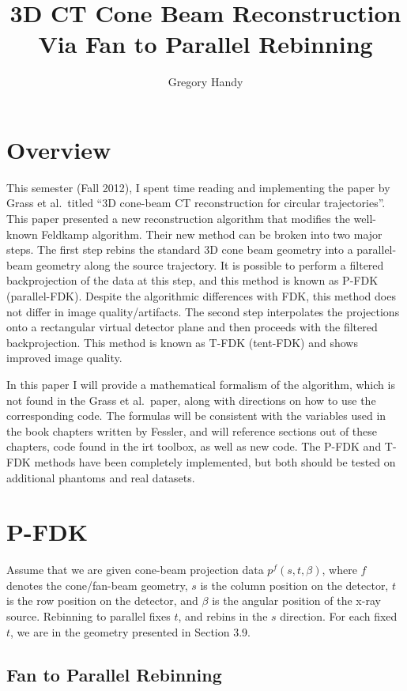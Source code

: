 \documentclass[12pt]{elsarticle}
\title{3D CT Cone Beam Reconstruction Via Fan to Parallel Rebinning}
\author{Gregory Handy}
\begin{document}
\maketitle

\section{Overview}


This semester (Fall 2012), I spent time reading and implementing the paper by Grass et al.\ titled ``3D cone-beam CT reconstruction for circular trajectories''. This paper presented a new reconstruction algorithm that modifies the well-known Feldkamp algorithm. Their new method can be broken into two major steps. The first step rebins the standard 3D cone beam geometry into a parallel-beam geometry along the source trajectory. It is possible to perform a filtered backprojection of the data at this step, and this method is known as P-FDK (parallel-FDK). Despite the algorithmic differences with FDK, this method does not differ in image quality/artifacts. The second step interpolates the projections onto a rectangular virtual detector plane and then proceeds with the filtered backprojection. This method is known as T-FDK (tent-FDK) and shows improved image quality.

In this paper I will provide a mathematical formalism of the algorithm, which is not found in the Grass et al.\ paper, along with directions on how to use the corresponding code. The formulas will be consistent with the variables used in the book chapters written by Fessler, and will reference sections out of these chapters, code found in the irt toolbox, as well as new code. The P-FDK and T-FDK methods have been completely implemented, but both should be tested on additional phantoms and real datasets. 


\section{P-FDK}
Assume that we are given cone-beam projection data $p^f(s,t,\beta)$, where
$f$ denotes the cone/fan-beam geometry, $s$ is the column position on the detector, $t$ is the row position on the detector, and $\beta$ is the angular position of the x-ray source. Rebinning to parallel fixes $t$, and rebins in the $s$ direction. For each fixed $t$, we are in the geometry presented in Section 3.9.

\subsection{Fan to Parallel Rebinning}
\end{document}
